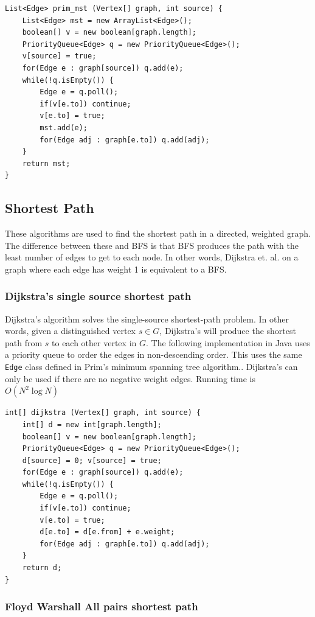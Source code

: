 \documentclass[a4paper,12pt]{article}
\begin{document}
\begin{lstlisting}
List<Edge> prim_mst (Vertex[] graph, int source) {
	List<Edge> mst = new ArrayList<Edge>();
	boolean[] v = new boolean[graph.length];
	PriorityQueue<Edge> q = new PriorityQueue<Edge>();
	v[source] = true;
	for(Edge e : graph[source]) q.add(e);
	while(!q.isEmpty()) {
		Edge e = q.poll();
		if(v[e.to]) continue;
		v[e.to] = true;
		mst.add(e);
		for(Edge adj : graph[e.to]) q.add(adj);
	}
	return mst;
}
\end{lstlisting}

\subsection{Shortest Path}

These algorithms are used to find the shortest path in a directed, weighted graph. The difference between these and BFS is that BFS produces the path with the least number of edges to get to each node. In other words, Dijkstra et. al. on a graph where each edge has weight 1 is equivalent to a BFS.

\subsubsection{Dijkstra's single source shortest path}

Dijkstra's algorithm solves the single-source shortest-path problem. In other words, given a distinguished vertex $s \in G$, Dijkstra's will produce the shortest path from $s$ to each other vertex in $G$. The following implementation in Java uses a priority queue to order the edges in non-descending order. This uses the same \verb|Edge| class defined in Prim's minimum spanning tree algorithm.. Dijkstra's can only be used if there are no negative weight edges. Running time is $O(N^2\log N)$


\begin{lstlisting}
int[] dijkstra (Vertex[] graph, int source) {
	int[] d = new int[graph.length];
	boolean[] v = new boolean[graph.length];
	PriorityQueue<Edge> q = new PriorityQueue<Edge>();
	d[source] = 0; v[source] = true;
	for(Edge e : graph[source]) q.add(e);
	while(!q.isEmpty()) {
		Edge e = q.poll();
		if(v[e.to]) continue;
		v[e.to] = true;
		d[e.to] = d[e.from] + e.weight;
		for(Edge adj : graph[e.to]) q.add(adj);
	}
	return d;
}
\end{lstlisting}

\subsubsection{Floyd Warshall All pairs shortest path}
\end{document}
